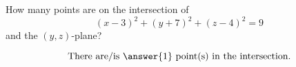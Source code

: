 \documentclass{ximera}
\author{Bart Snapp}
\begin{document}
\begin{exercise}
  How many points are on the intersection of
  \[
  (x-3)^2 + (y+7)^2 + (z-4)^2 = 9
  \]
  and the $(y,z)$-plane?
  \begin{prompt}
  \[
  \text{There are/is $\answer{1}$ point(s) in the intersection.}
  \]
  \end{prompt}
\end{exercise}
\end{document}
